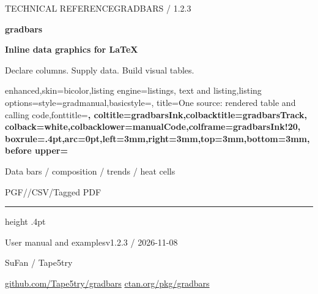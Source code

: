 \begingroup
\setlength{\parindent}{0pt}
\setlength{\parskip}{4pt}
\thispagestyle{empty}
{\small\sffamily\color{gradbarsTeal}TECHNICAL REFERENCE\hfill GRADBARS / 1.2.3}\par
\vspace{8mm}
{\fontsize{50}{54}\selectfont\sffamily\bfseries\color{gradbarsInk}gradbars}\par
\vspace{3mm}
{\Large\bfseries\color{gradbarsInk}Inline data graphics for \LaTeX}\par
\vspace{3mm}
{\large\color{black!55}Declare columns. Supply data. Build visual tables.}\par
\vspace{7mm}
\begin{tcblisting}{enhanced,skin=bicolor,listing engine=listings,
  text and listing,listing options={style=gradmanual,basicstyle=\gradbarscodefont\fontsize{8}{10}\selectfont},
  title={One source: rendered table and calling code},fonttitle=\small\bfseries,
  coltitle=gradbarsInk,colbacktitle=gradbarsTrack,
  colback=white,colbacklower=manualCode,colframe=gradbarsInk!20,
  boxrule=.4pt,arc=0pt,left=3mm,right=3mm,top=3mm,bottom=3mm,
  before upper={\small\setlength{\parindent}{0pt}}}
\begin{center}
\begin{gradtable}[align=c,header align=c,width=\linewidth,column sep=4pt,row stretch=1.5,label width=7mm]
\end{gradtable}
\end{center}
\end{tcblisting}
\vspace{3mm}
{\small\sffamily\color{gradbarsTeal}Data bars / composition / trends / heat cells}\par
{\small\color{black!55}PGF/\manualTikZ{}\quad /\quad CSV\quad /\quad Tagged PDF}\par
\vfill
{\color{gradbarsInk!20}\hrule height .4pt}
\vspace{4mm}
{\small\sffamily\color{gradbarsInk}User manual and examples\hfill v1.2.3 / 2026-11-08}\par
{\small\sffamily SuFan / Tape5try}\par
{\footnotesize\href{https://github.com/Tape5try/gradbars}{github.com/Tape5try/gradbars}
\hfill\href{https://ctan.org/pkg/gradbars}{ctan.org/pkg/gradbars}}\par
\endgroup
